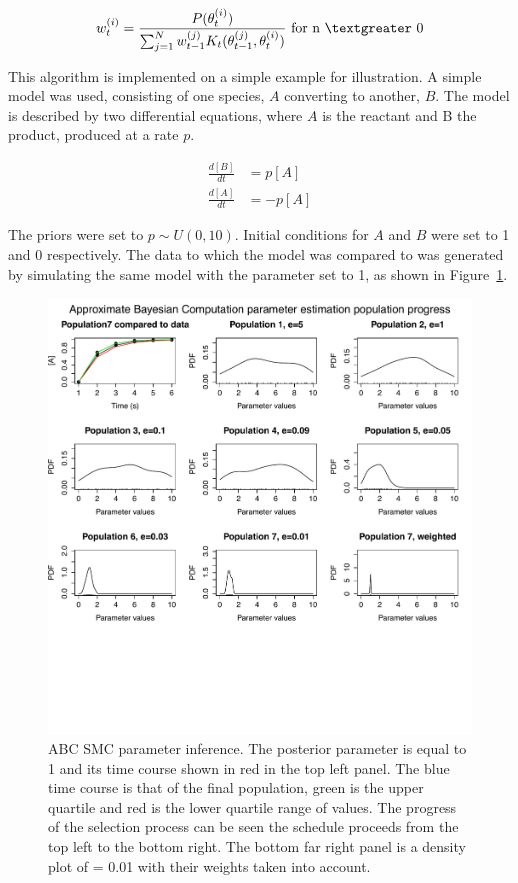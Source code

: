 \begin{align}
w_{t}^{(i)} = \frac{P(\theta_{t}^{(i)})}{\sum_{j=1}^N w_{t-1}^{(j)} K_{t}(\theta_{t-1}^{(j)}, \theta_{t}^{(i)})} \text{ for n $\textgreater$  0}
\end{align}
	
This algorithm is implemented on a simple example for illustration. A simple model was used, consisting of one species, $A$ converting to another, $B$. The model is described by two differential equations, where $A$ is the reactant and B the product, produced at a rate $p$. 

\begin{align}
\frac{d[B]}{dt} &= p[A] \\ 
\frac{d[A]}{dt} &= -p[A] 
\end{align}

The priors were set to $p \sim U(0, 10)$. Initial conditions for $A$ and $B$ were set to 1 and 0 respectively. The data to which the model was compared to was generated by simulating the same model with the parameter set to 1, as shown in Figure~\ref{fig:myABC true 1}.

\begin{figure}[htbp]
    \begin{center}
    \includegraphics[scale=0.6]{../../chapters/chapterIntroduction/images/abcsmc_ex.pdf}
    \caption[\acrshort{abc} \acrshort{smc} example]{ABC SMC parameter inference. The posterior parameter is equal to 1 and its time course shown in red in the top left panel. The blue time course is that of the final population, green is the upper quartile and red is the lower quartile range of values. The progress of the selection process can be seen the \textepsilon schedule proceeds from the top left to the bottom right. The bottom far right panel is a density plot of \textepsilon = 0.01 with their weights taken into account.  }
    \label{fig:myABC true 1}
    \end{center}
\end{figure}
\clearpage

